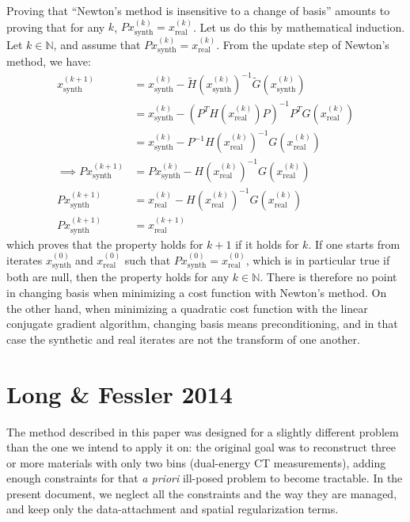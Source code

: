 \documentclass[a4paper, 10pt]{article}
\begin{document}
Proving that ``Newton's method is insensitive to a change of basis'' amounts to proving that for any $k$, $Px_{\text{synth}}^{(k)} = x_{\text{real}}^{(k)}$.
Let us do this by mathematical induction. Let $k \in \mathbb{N}$, and assume that $Px_{\text{synth}}^{(k)} = x_{\text{real}}^{(k)}$.
From the update step of Newton's method, we have:
\begin{equation*}
\begin{split}
  x_{\text{synth}}^{(k+1)} &= x_{\text{synth}}^{(k)} - \widetilde{H}(x_{\text{synth}}^{(k)})^{-1} \widetilde{G}(x_{\text{synth}}^{(k)}) \\
			   &= x_{\text{synth}}^{(k)} - \left( P^T H(x_{\text{real}}^{(k)}) P \right)^{-1} P^T G(x_{\text{real}}^{(k)}) \\
			   &= x_{\text{synth}}^{(k)} - P^{-1} H(x_{\text{real}}^{(k)})^{-1} G(x_{\text{real}}^{(k)}) \\
\implies P x_{\text{synth}}^{(k+1)} &= P x_{\text{synth}}^{(k)} - H(x_{\text{real}}^{(k)})^{-1} G(x_{\text{real}}^{(k)}) \\
P x_{\text{synth}}^{(k+1)} &= x_{\text{real}}^{(k)} - H(x_{\text{real}}^{(k)})^{-1} G(x_{\text{real}}^{(k)}) \\
P x_{\text{synth}}^{(k+1)} &= x_{\text{real}}^{(k+1)}
 \end{split}
\end{equation*}
which proves that the property holds for $k+1$ if it holds for $k$. If one starts from iterates $x_{\text{synth}}^{(0)}$ and $x_{\text{real}}^{(0)}$ such that
$P x_{\text{synth}}^{(0)} = x_{\text{real}}^{(0)}$, which is in particular true if both are null, then the property holds for any $k \in \mathbb{N}$.
There is therefore no point in changing basis when minimizing a cost function with Newton's method.
On the other hand, when minimizing a quadratic cost function with the linear conjugate gradient algorithm, changing basis means preconditioning, and in that case
the synthetic and real iterates are not the transform of one another. 

\section{Long \& Fessler 2014}
The method described in this paper \cite{long_multi-material_2014} was designed for a slightly different problem than the one we intend to apply it on: the original goal was 
to reconstruct three or more materials with only two bins (dual-energy CT measurements), adding enough constraints for that \textit{a priori} ill-posed problem to become tractable. 
In the present document, we neglect all the constraints and the way they are managed, and keep only the data-attachment and spatial regularization terms. 
\end{document}

